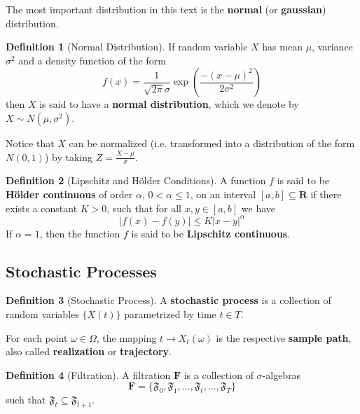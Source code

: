 \documentclass[12pt,a4paper]{article}
\theoremstyle{definition}
\newtheorem{definition}{Definition}[section]
\begin{document}
The most important distribution in this text is the \textbf{normal} (or \textbf{gaussian}) distribution.
 
\begin{definition}[Normal Distribution]
	If random variable $X$ has mean $\mu$, variance $\sigma^2$ and a density function of the form
	\[
		f(x) = \frac{1}{\sqrt{2\pi} \sigma} \exp \left( \frac{-(x-\mu)^2}{2\sigma^2} \right) 
	\]
	then $X$ is said to have a \textbf{normal distribution}, which we denote by $X \sim N(\mu, \sigma^2)$.
\end{definition}

Notice that $X$ can be normalized (i.e. transformed into a distribution of the form $N(0,1)$) by taking $Z = \frac{X-\mu}{\sigma}$.


\begin{definition}[Lipschitz and H\"older Conditions]
	A function $f$ is said to be \textbf{H\"older continuous} of order $\alpha$, $0 < \alpha \leq 1$, on an interval $[a,b] \subseteq \textbf{R}$ if there exists a constant $K > 0$, such that for all $x,y \in [a,b]$ we have
	\[
		|f(x) - f(y)| \leq K |x-y|^{\alpha}
	\]
	If $\alpha = 1$, then the function $f$ is said to be \textbf{Lipschitz continuous}.
\end{definition}

\subsection{Stochastic Processes}

\begin{definition}[Stochastic Process]
	A \textbf{stochastic process} is a collection of random variables $\{ X(t) \}$ parametrized by time $t \in T$.  
	
	For each point $\omega \in \Omega$, the mapping $t \longrightarrow X_t(\omega)$ is the respective \textbf{sample path}, also called \textbf{realization} or \textbf{trajectory}.
\end{definition}

\begin{definition}[Filtration]
	A filtration $\textbf{F}$ is a collection of $\sigma$-algebras
	\[
		\textbf{F} = \{ \mathfrak{F}_0, \mathfrak{F}_1, \ldots, \mathfrak{F}_t, \ldots, \mathfrak{F}_T \}
	\]
	such that $\mathfrak{F}_t \subseteq \mathfrak{F}_{t+1}$.
\end{definition}
\end{document}
